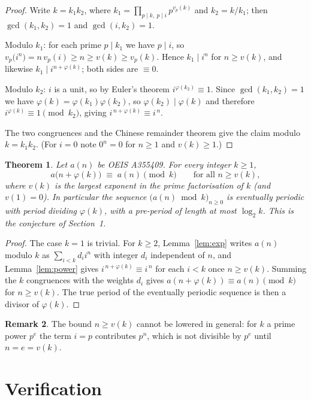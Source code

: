 \documentclass[11pt,a4paper]{article}
\theoremstyle{plain}
\newtheorem{theorem}{Theorem}
\theoremstyle{definition}
\newtheorem{remark}[theorem]{Remark}
\begin{document}
\begin{proof}
Write $k=k_1k_2$, where $k_1=\prod_{p\mid k,\ p\mid i}p^{v_p(k)}$ and $k_2=k/k_1$; then
$\gcd(k_1,k_2)=1$ and $\gcd(i,k_2)=1$.

Modulo $k_1$: for each prime $p\mid k_1$ we have $p\mid i$, so
$v_p\bigl(i^{n}\bigr)=n\,v_p(i)\ge n\ge v(k)\ge v_p(k)$. Hence $k_1\mid i^{n}$ for
$n\ge v(k)$, and likewise $k_1\mid i^{n+\varphi(k)}$; both sides are $\equiv 0$.

Modulo $k_2$: $i$ is a unit, so by Euler's theorem $i^{\varphi(k_2)}\equiv 1$. Since
$\gcd(k_1,k_2)=1$ we have $\varphi(k)=\varphi(k_1)\varphi(k_2)$, so
$\varphi(k_2)\mid\varphi(k)$ and therefore $i^{\varphi(k)}\equiv 1 \pmod{k_2}$, giving
$i^{\,n+\varphi(k)}\equiv i^{\,n}$.

The two congruences and the Chinese remainder theorem give the claim modulo $k=k_1k_2$.
(For $i=0$ note $0^{n}=0$ for $n\ge 1$ and $v(k)\ge1$.)
\end{proof}

\begin{theorem}\label{thm:main}
Let $a(n)$ be OEIS A355409. For every integer $k\ge1$,
\[
a\bigl(n+\varphi(k)\bigr)\;\equiv\;a(n)\pmod{k}\qquad\text{for all } n\ge v(k),
\]
where $v(k)$ is the largest exponent in the prime factorisation of $k$ (and $v(1)=0$).
In particular the sequence $\bigl(a(n)\bmod k\bigr)_{n\ge0}$ is eventually periodic with
period dividing $\varphi(k)$, with a pre-period of length at most $\log_2 k$. This is the
conjecture of Section~1.
\end{theorem}

\begin{proof}
The case $k=1$ is trivial. For $k\ge2$, Lemma~\ref{lem:exp} writes $a(n)$ modulo $k$ as
$\sum_{i<k}d_i i^{n}$ with integer $d_i$ independent of $n$, and Lemma~\ref{lem:power}
gives $i^{\,n+\varphi(k)}\equiv i^{\,n}$ for each $i<k$ once $n\ge v(k)$. Summing the
$k$ congruences with the weights $d_i$ gives
$a(n+\varphi(k))\equiv a(n)\pmod k$ for $n\ge v(k)$. The true period of the eventually
periodic sequence is then a divisor of $\varphi(k)$.
\end{proof}

\begin{remark}
The bound $n\ge v(k)$ cannot be lowered in general: for $k$ a prime power $p^{e}$ the
term $i=p$ contributes $p^{n}$, which is not divisible by $p^{e}$ until $n=e=v(k)$.
\end{remark}

\section{Verification}
\end{document}
